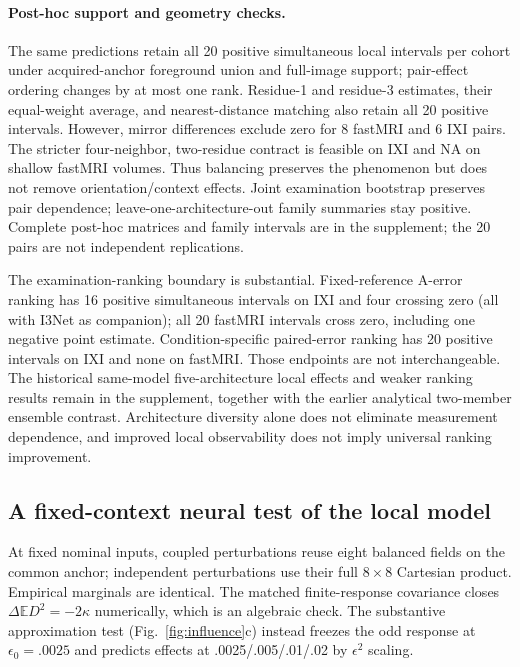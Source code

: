 \documentclass[10pt,twocolumn,letterpaper]{article}
\begin{document}
\paragraph{Post-hoc support and geometry checks.}
The same predictions retain all 20 positive simultaneous local intervals per cohort under acquired-anchor foreground union and full-image support; pair-effect ordering changes by at most one rank. Residue-1 and residue-3 estimates, their equal-weight average, and nearest-distance matching also retain all 20 positive intervals. However, mirror differences exclude zero for 8 fastMRI and 6 IXI pairs. The stricter four-neighbor, two-residue contract is feasible on IXI and NA on shallow fastMRI volumes. Thus balancing preserves the phenomenon but does not remove orientation/context effects. Joint examination bootstrap preserves pair dependence; leave-one-architecture-out family summaries stay positive. Complete post-hoc matrices and family intervals are in the supplement; the 20 pairs are not independent replications.

The examination-ranking boundary is substantial. Fixed-reference A-error ranking has 16 positive simultaneous intervals on IXI and four crossing zero (all with I3Net as companion); all 20 fastMRI intervals cross zero, including one negative point estimate. Condition-specific paired-error ranking has 20 positive intervals on IXI and none on fastMRI. Those endpoints are not interchangeable. The historical same-model five-architecture local effects and weaker ranking results remain in the supplement, together with the earlier analytical two-member ensemble contrast. Architecture diversity alone does not eliminate measurement dependence, and improved local observability does not imply universal ranking improvement.

\subsection{A fixed-context neural test of the local model}
At fixed nominal inputs, coupled perturbations reuse eight balanced fields on the common anchor; independent perturbations use their full $8\times8$ Cartesian product. Empirical marginals are identical. The matched finite-response covariance closes $\Delta\mathbb E D^2=-2\kappa$ numerically, which is an algebraic check. The substantive approximation test (Fig.~\ref{fig:influence}c) instead freezes the odd response at $\epsilon_0=.0025$ and predicts effects at .0025/.005/.01/.02 by $\epsilon^2$ scaling.
\end{document}
